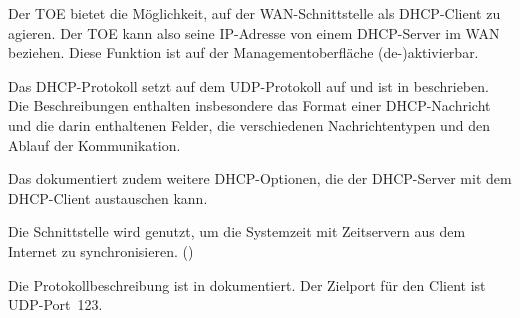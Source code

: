 









Der TOE bietet die Möglichkeit, auf der WAN-Schnittstelle als
DHCP-Client zu agieren. Der TOE kann also seine IP-Adresse von einem
DHCP-Server im WAN beziehen. Diese Funktion ist auf der Managementoberfläche
(de-)aktivierbar.



Das DHCP-Protokoll setzt auf dem UDP-Protokoll auf und ist in
 beschrieben. Die Beschreibungen enthalten
insbesondere das Format einer DHCP-Nachricht und die darin
enthaltenen Felder, die verschiedenen Nachrichtentypen und den Ablauf
der Kommunikation.

Das  dokumentiert zudem weitere DHCP-Optionen,
die der DHCP-Server mit dem DHCP-Client austauschen kann.



Die Schnittstelle wird genutzt, um die Systemzeit mit Zeitservern aus dem
Internet zu synchronisieren. ()



Die Protokollbeschreibung ist in 
dokumentiert. Der Zielport für den Client ist UDP-Port~123.



